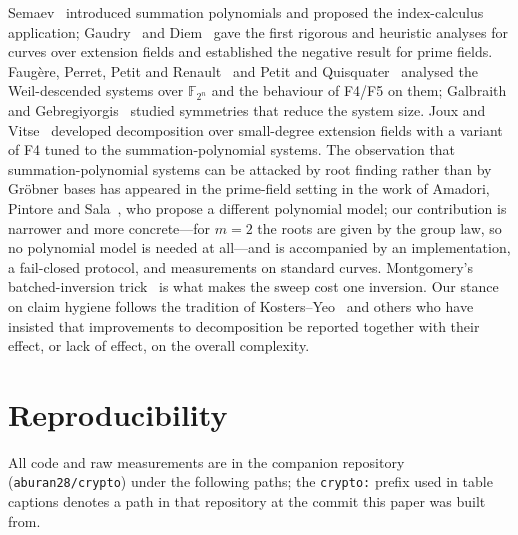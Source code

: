 \documentclass[10pt,a4paper]{article}
\theoremstyle{remark}
\newcommand{\FF}{\mathbb{F}}
\newcommand{\code}[1]{\texttt{#1}}
\begin{document}
Semaev~\cite{semaev2004} introduced summation polynomials and proposed
the index-calculus application; Gaudry~\cite{gaudry2009} and
Diem~\cite{diem2011} gave the first rigorous and heuristic analyses for
curves over extension fields and established the negative result for
prime fields. Faug\`ere, Perret, Petit and Renault~\cite{fppr2012} and
Petit and Quisquater~\cite{petitquisquater2012} analysed the
Weil-descended systems over $\FF_{2^n}$ and the behaviour of F4/F5 on
them; Galbraith and Gebregiyorgis~\cite{galbraithgebregiyorgis2014}
studied symmetries that reduce the system size. Joux and
Vitse~\cite{jouxvitse2013} developed decomposition over small-degree
extension fields with a variant of F4 tuned to the summation-polynomial
systems. The observation that summation-polynomial systems can be
attacked by root finding rather than by Gr\"obner bases has appeared in
the prime-field setting in the work of Amadori, Pintore and
Sala~\cite{amadoripintoresala2018}, who propose a different polynomial
model; our contribution is narrower and more concrete---for $m = 2$ the
roots are given by the group law, so no polynomial model is needed at
all---and is accompanied by an implementation, a fail-closed protocol,
and measurements on standard curves. Montgomery's batched-inversion
trick~\cite{montgomery1987} is what makes the sweep cost one inversion.
Our stance on claim hygiene follows the tradition of
Kosters--Yeo~\cite{kostersyeo2015} and others who have insisted that
improvements to decomposition be reported together with their effect,
or lack of effect, on the overall complexity.

\section{Reproducibility}
\label{sec:repro}

All code and raw measurements are in the companion repository
(\code{aburan28/crypto}) under the following paths; the \code{crypto:}
prefix used in table captions denotes a path in that repository at the
commit this paper was built from.
\end{document}
